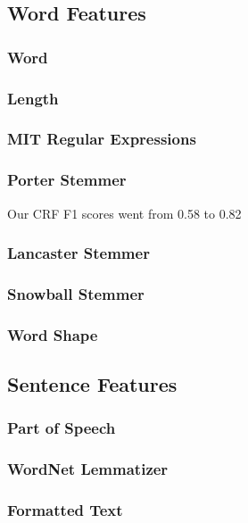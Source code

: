 \documentclass[preprint]{style}
\begin{document}
\subsection{Word Features}

\subsubsection{Word}

\subsubsection{Length}

\subsubsection{MIT Regular Expressions}

\subsubsection{Porter Stemmer}
Our CRF F1 scores went from 0.58 to 0.82

\subsubsection{Lancaster Stemmer}

\subsubsection{Snowball Stemmer}

\subsubsection{Word Shape}

\subsection{Sentence Features}

\subsubsection{Part of Speech}

\subsubsection{WordNet Lemmatizer}

\subsubsection{Formatted Text}
\end{document}
